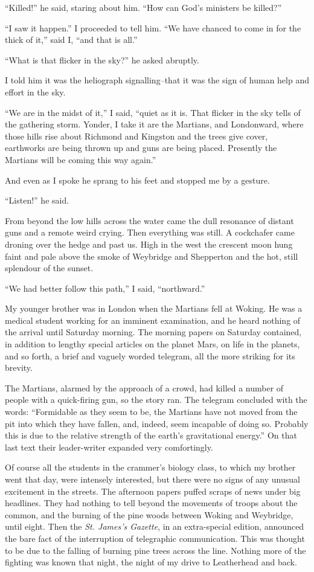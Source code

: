 ``Killed!'' he said, staring about him. ``How can God's ministers be
killed?''

``I saw it happen.'' I proceeded to tell him. ``We have chanced to
come in for the thick of it,'' said I, ``and that is all.''

``What is that flicker in the sky?'' he asked abruptly.

I told him it was the heliograph signalling--that it was the sign
of human help and effort in the sky.

``We are in the midst of it,'' I said, ``quiet as it is. That flicker
in the sky tells of the gathering storm. Yonder, I take it are the
Martians, and Londonward, where those hills rise about Richmond and
Kingston and the trees give cover, earthworks are being thrown up
and guns are being placed. Presently the Martians will be coming
this way again.''

And even as I spoke he sprang to his feet and stopped me by a
gesture.

``Listen!'' he said.

From beyond the low hills across the water came the dull resonance
of distant guns and a remote weird crying. Then everything was
still. A cockchafer came droning over the hedge and past us. High
in the west the crescent moon hung faint and pale above the smoke
of Weybridge and Shepperton and the hot, still splendour of the
sunset.

``We had better follow this path,'' I said, ``northward.''

My younger brother was in London when the Martians fell at Woking.
He was a medical student working for an imminent examination, and
he heard nothing of the arrival until Saturday morning. The morning
papers on Saturday contained, in addition to lengthy special
articles on the planet Mars, on life in the planets, and so forth,
a brief and vaguely worded telegram, all the more striking for its
brevity.

The Martians, alarmed by the approach of a crowd, had killed a
number of people with a quick-firing gun, so the story ran. The
telegram concluded with the words: ``Formidable as they seem to be,
the Martians have not moved from the pit into which they have
fallen, and, indeed, seem incapable of doing so. Probably this is
due to the relative strength of the earth's gravitational energy.''
On that last text their leader-writer expanded very comfortingly.

Of course all the students in the crammer's biology class, to which
my brother went that day, were intensely interested, but there were
no signs of any unusual excitement in the streets. The afternoon
papers puffed scraps of news under big headlines. They had nothing
to tell beyond the movements of troops about the common, and the
burning of the pine woods between Woking and Weybridge, until
eight. Then the \emph{St. James's Gazette}, in an extra-special
edition, announced the bare fact of the interruption of telegraphic
communication. This was thought to be due to the falling of burning
pine trees across the line. Nothing more of the fighting was known
that night, the night of my drive to Leatherhead and back.

